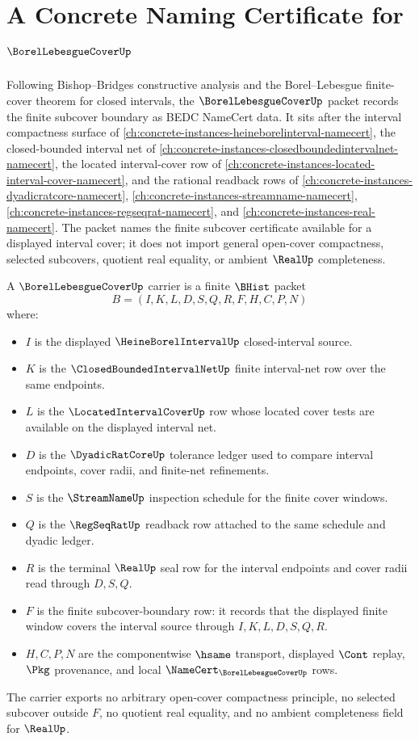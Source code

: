 \chapter{A Concrete Naming Certificate for $\BorelLebesgueCoverUp$}
\label{ch:concrete-instances-borel-lebesgue-cover-namecert}

Following Bishop--Bridges constructive analysis and the Borel--Lebesgue
finite-cover theorem for closed intervals, the $\BorelLebesgueCoverUp$ packet
records the finite subcover boundary as BEDC NameCert data. It sits after the
interval compactness surface of \autoref{ch:concrete-instances-heineborelinterval-namecert},
the closed-bounded interval net of
\autoref{ch:concrete-instances-closedboundedintervalnet-namecert}, the located
interval-cover row of \autoref{ch:concrete-instances-located-interval-cover-namecert},
and the rational readback rows of
\autoref{ch:concrete-instances-dyadicratcore-namecert},
\autoref{ch:concrete-instances-streamname-namecert},
\autoref{ch:concrete-instances-regseqrat-namecert}, and
\autoref{ch:concrete-instances-real-namecert}. The packet names the finite
subcover certificate available for a displayed interval cover; it does not
import general open-cover compactness, selected subcovers, quotient real
equality, or ambient $\RealUp$ completeness.

\begin{definition}
\label{def:borel-lebesgue-cover-carrier}
A $\BorelLebesgueCoverUp$ carrier is a finite $\BHist$ packet
$$
B=(I,K,L,D,S,Q,R,F,H,C,P,N)
$$
where:
\begin{itemize}
\item $I$ is the displayed $\HeineBorelIntervalUp$ closed-interval source.
\item $K$ is the $\ClosedBoundedIntervalNetUp$ finite interval-net row over
the same endpoints.
\item $L$ is the $\LocatedIntervalCoverUp$ row whose located cover tests are
available on the displayed interval net.
\item $D$ is the $\DyadicRatCoreUp$ tolerance ledger used to compare interval
endpoints, cover radii, and finite-net refinements.
\item $S$ is the $\StreamNameUp$ inspection schedule for the finite cover
windows.
\item $Q$ is the $\RegSeqRatUp$ readback row attached to the same schedule and
dyadic ledger.
\item $R$ is the terminal $\RealUp$ seal row for the interval endpoints and
cover radii read through $D,S,Q$.
\item $F$ is the finite subcover-boundary row: it records that the displayed
finite window covers the interval source through $I,K,L,D,S,Q,R$.
\item $H,C,P,N$ are the componentwise $\hsame$ transport, displayed $\Cont$
replay, $\Pkg$ provenance, and local $\NameCert_{\BorelLebesgueCoverUp}$ rows.
\end{itemize}
The carrier exports no arbitrary open-cover compactness principle, no selected
subcover outside $F$, no quotient real equality, and no ambient completeness
field for $\RealUp$.
\end{definition}

